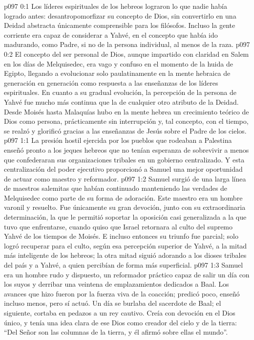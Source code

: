 \author{Melquisedec}
\vs p097 0:1 Los líderes espirituales de los hebreos lograron lo que nadie había logrado antes: desantropomorfizar su concepto de Dios, sin convertirlo en una Deidad abstracta únicamente comprensible para los filósofos. Incluso la gente corriente era capaz de considerar a Yahvé, en el concepto que había ido madurando, como Padre, si no de la persona individual, al menos de la raza.
\vs p097 0:2 El concepto del ser personal de Dios, aunque impartido con claridad en Salem en los días de Melquisedec, era vago y confuso en el momento de la huida de Egipto, llegando a evolucionar solo paulatinamente en la mente hebraica de generación en generación como respuesta a las enseñanzas de los líderes espirituales. En cuanto a su gradual evolución, la percepción de la persona de Yahvé fue mucho más continua que la de cualquier otro atributo de la Deidad. Desde Moisés hasta Malaquías hubo en la mente hebrea un crecimiento teórico de Dios como persona, prácticamente sin interrupción y, tal concepto, con el tiempo, se realzó y glorificó gracias a las enseñanzas de Jesús sobre el Padre de los cielos.
\vs p097 1:1 La presión hostil ejercida por los pueblos que rodeaban a Palestina enseñó pronto a los jeques hebreos que no tenían esperanza de sobrevivir a menos que confederaran sus organizaciones tribales en un gobierno centralizado. Y esta centralización del poder ejecutivo proporcionó a Samuel una mejor oportunidad de actuar como maestro y reformador.
\vs p097 1:2 Samuel surgió de una larga línea de maestros salemitas que habían continuado manteniendo las verdades de Melquisedec como parte de su forma de adoración. Este maestro era un hombre varonil y resuelto. Fue únicamente su gran devoción, junto con su extraordinaria determinación, la que le permitió soportar la oposición casi generalizada a la que tuvo que enfrentarse, cuando quiso que Israel retornara al culto del supremo Yahvé de los tiempos de Moisés. E incluso entonces su triunfo fue parcial; solo logró recuperar para el culto, según esa percepción superior de Yahvé, a la mitad más inteligente de los hebreos; la otra mitad siguió adorando a los dioses tribales del país y a Yahvé, a quien percibían de forma más superficial.
\vs p097 1:3 Samuel era un hombre rudo y dispuesto, un reformador práctico capaz de salir un día con los suyos y derribar una veintena de emplazamientos dedicados a Baal. Los avances que hizo fueron por la fuerza viva de la coacción; predicó poco, enseñó incluso menos, pero sí actuó. Un día se burlaba del sacerdote de Baal; el siguiente, cortaba en pedazos a un rey cautivo. Creía con devoción en el Dios único, y tenía una idea clara de ese Dios como creador del cielo y de la tierra: “Del Señor son las columnas de la tierra, y él afirmó sobre ellas el mundo”.
